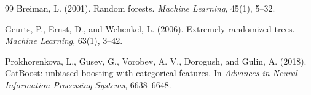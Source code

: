 \documentclass[10pt,twocolumn]{article}
\begin{document}
\begin{thebibliography}{99}
Breiman, L. (2001).
Random forests.
\textit{Machine Learning}, 45(1), 5--32.

Geurts, P., Ernst, D., and Wehenkel, L. (2006).
Extremely randomized trees.
\textit{Machine Learning}, 63(1), 3--42.

Prokhorenkova, L., Gusev, G., Vorobev, A. V., Dorogush, and Gulin, A. (2018).
CatBoost: unbiased boosting with categorical features.
In \textit{Advances in Neural Information Processing Systems}, 6638--6648.

\end{thebibliography}
\end{document}
